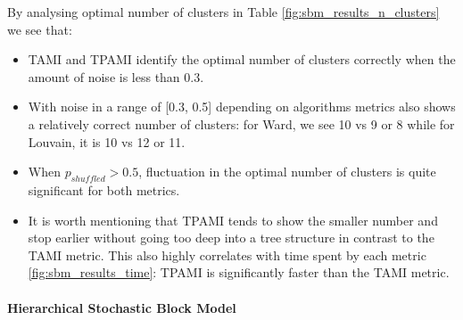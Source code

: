 \newpage

By analysing optimal number of clusters in Table \ref{fig:sbm_results_n_clusters} we see that: 
\begin{itemize}
	\item TAMI and TPAMI identify the optimal number of clusters correctly when the amount of noise is less than 0.3.
	\item With noise in a range of [0.3, 0.5] depending on algorithms metrics also shows a relatively correct number of clusters: for Ward, we see 10 vs 9 or 8 while for Louvain, it is 10 vs 12 or 11.
	\item When $p_{shuffled} > 0.5$, fluctuation in the optimal number of clusters is quite significant for both metrics.
	\item It is worth mentioning that TPAMI tends to show the smaller number and stop earlier without going too deep into a tree structure in contrast to the TAMI metric. This also highly correlates with time spent by each metric \ref{fig:sbm_results_time}: TPAMI is significantly faster than the TAMI metric. 
\end{itemize} 


\paragraph{Hierarchical Stochastic Block Model}

